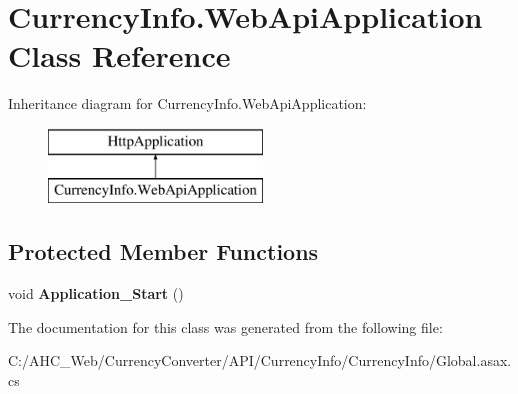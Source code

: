 \hypertarget{class_currency_info_1_1_web_api_application}{\section{Currency\-Info.\-Web\-Api\-Application Class Reference}
\label{class_currency_info_1_1_web_api_application}
}
Inheritance diagram for Currency\-Info.\-Web\-Api\-Application\-:\begin{figure}[H]
\begin{center}
\leavevmode
\includegraphics[height=2.000000cm]{class_currency_info_1_1_web_api_application}
\end{center}
\end{figure}
\subsection*{Protected Member Functions}
\begin{DoxyCompactItemize}
\item 
\hypertarget{class_currency_info_1_1_web_api_application_a1565c0411f985a72dde6630806711ee6}{void {\bfseries Application\-\_\-\-Start} ()}\label{class_currency_info_1_1_web_api_application_a1565c0411f985a72dde6630806711ee6}

\end{DoxyCompactItemize}


The documentation for this class was generated from the following file\-:\begin{DoxyCompactItemize}
\item 
C\-:/\-A\-H\-C\-\_\-\-Web/\-Currency\-Converter/\-A\-P\-I/\-Currency\-Info/\-Currency\-Info/Global.\-asax.\-cs\end{DoxyCompactItemize}
